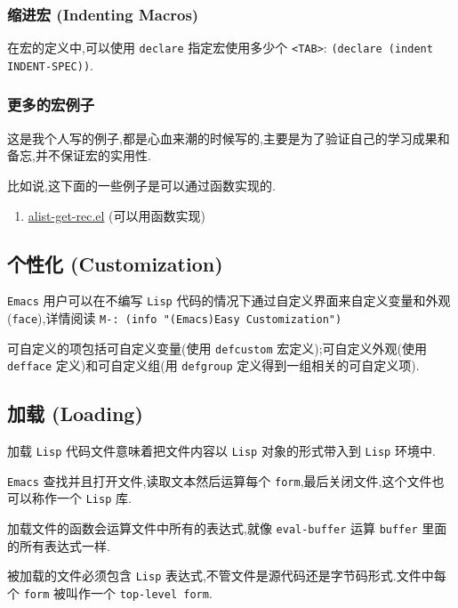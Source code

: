 \documentclass[11pt]{article}
\begin{document}
\subsubsection{缩进宏 (Indenting Macros)}
\label{sec:org3ff3e7d}

在宏的定义中,可以使用 \texttt{declare} 指定宏使用多少个 \texttt{<TAB>}: \texttt{(declare (indent INDENT-SPEC))}.


\subsubsection{更多的宏例子}
\label{sec:org666734c}

这是我个人写的例子,都是心血来潮的时候写的,主要是为了验证自己的学习成果和备忘,并不保证宏的实用性.

比如说,这下面的一些例子是可以通过函数实现的.

\begin{enumerate}
\item \href{../../../files/alist-get-rec.el}{alist-get-rec.el} (可以用函数实现)
\end{enumerate}


\subsection{个性化 (Customization)}
\label{sec:org9e30833}

\texttt{Emacs} 用户可以在不编写 \texttt{Lisp} 代码的情况下通过自定义界面来自定义变量和外观(\texttt{face}),详情阅读 \texttt{M-: (info "(Emacs)Easy Customization")}

可自定义的项包括可自定义变量(使用 \texttt{defcustom} 宏定义);可自定义外观(使用 \texttt{defface} 定义)和可自定义组(用 \texttt{defgroup} 定义得到一组相关的可自定义项).


\subsection{加载 (Loading)}
\label{sec:org94c2213}

加载 \texttt{Lisp} 代码文件意味着把文件内容以 \texttt{Lisp} 对象的形式带入到 \texttt{Lisp} 环境中.

\texttt{Emacs} 查找并且打开文件,读取文本然后运算每个 \texttt{form},最后关闭文件,这个文件也可以称作一个 \texttt{Lisp} 库.

加载文件的函数会运算文件中所有的表达式,就像 \texttt{eval-buffer} 运算 \texttt{buffer} 里面的所有表达式一样.

被加载的文件必须包含 \texttt{Lisp} 表达式,不管文件是源代码还是字节码形式.文件中每个 \texttt{form} 被叫作一个 \texttt{top-level form}.
\end{document}

